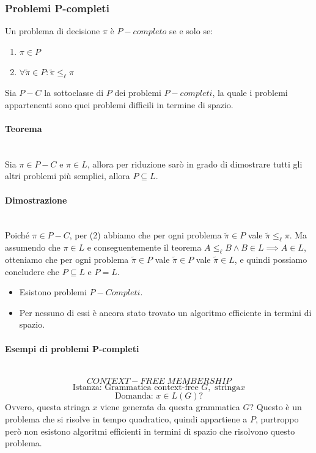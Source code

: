 \documentclass{article}
\begin{document}
\subsubsection{Problemi P-completi}
Un problema di decisione $\pi$ è $P-completo$ se e solo se:
\begin{enumerate}
    \item $\pi\in P$
    \item $\forall\tilde{\pi}\in P:\tilde{\pi}\leq_{\ell}\pi$
\end{enumerate}
Sia $P-C$ la sottoclasse di $P$ dei problemi $P-completi$, la quale i problemi appartenenti
sono quei problemi difficili in termine di spazio.

\paragraph{Teorema}\mbox{}\\
Sia $\pi\in P-C$ e $\pi\in L$, allora per riduzione sarò in grado di dimostrare
tutti gli altri problemi più semplici, allora $P\subseteq L$.

\paragraph{Dimostrazione}\mbox{}\\
Poiché $\pi\in P-C$, per (2) abbiamo che per ogni problema $\tilde{\pi}\in P$ vale
$\tilde{\pi}\leq_{\ell}\pi$. Ma assumendo che $\pi\in L$ e conseguentemente il teorema
$A\leq_{\ell}B\land B\in L\implies A\in L$, otteniamo che per ogni problema $\tilde{\pi}\in P$
vale $\tilde{\pi}\in P$ vale $\tilde{\pi}\in L$, e quindi possiamo concludere che $P\subseteq L$
e $P=L$.

\begin{itemize}
    \item Esistono problemi $P-Completi$.
    \item Per nessuno di essi è ancora stato trovato un algoritmo efficiente in termini
          di spazio.
\end{itemize}
\pagebreak
\paragraph{Esempi di problemi P-completi}\mbox{}\\
$$CONTEXT-FREE\;MEMBERSHIP$$
$$\text{Istanza: Grammatica context-free }G,\text{ stringa}x$$
$$\text{Domanda: }x\in L(G)?$$
Ovvero, questa stringa $x$ viene generata da questa grammatica $G$? Questo è un problema
che si risolve in tempo quadratico, quindi appartiene a $P$, purtroppo però non esistono
algoritmi efficienti in termini di spazio che risolvono questo problema.
\end{document}
